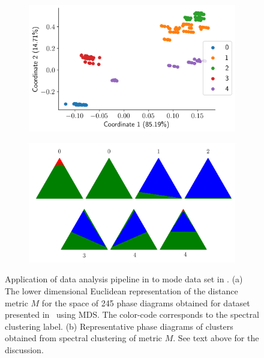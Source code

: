 \begin{figure}[h]\label{fig:synthdata}
    \centering
    \begin{subfigure}[b]{0.48\textwidth}
        \centering
        \includegraphics[width=\textwidth]{Chapter-4/figures/result2/result2_Synthetic_MDS.png}
        \label{fig:result2_synthetic_mds}
    \end{subfigure}
    \hfill
    \begin{subfigure}[b]{0.48\textwidth}
        \centering
        \includegraphics[width=\textwidth]{Chapter-4/figures/result2/result2_synthetic_clusters_manual.png}
        \caption{}
        \label{fig:result2_synthetic_clusters}
     \end{subfigure}
    \caption{Application of data analysis pipeline in  to mode data set in . (a) The lower dimensional Euclidean representation of the distance metric \(M\) for the space of 245 phase diagrams obtained for dataset presented in~ using MDS. The color-code corresponds to the spectral clustering label. (b) Representative phase diagrams of clusters obtained from spectral clustering of metric \(M\). See text above for the discussion.}
\end{figure}

